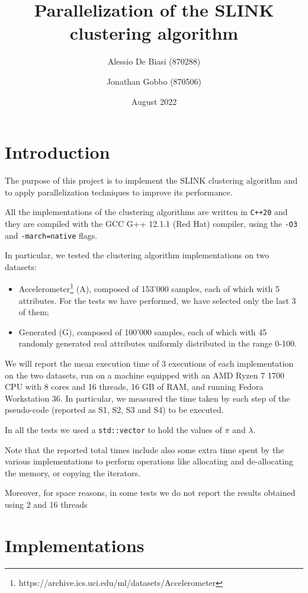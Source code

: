 \documentclass{article}
\title{Parallelization of the SLINK clustering algorithm\vspace{-1.25ex}}
\author{Alessio De Biasi (870288) \and Jonathan Gobbo (870506)}
\date{August 2022}
\begin{document}
\twocolumn
\maketitle

\section{Introduction}

The purpose of this project is to implement the SLINK clustering algorithm and to apply
parallelization techniques to improve its performance.

All the implementations of the clustering algorithms are written in \texttt{C++20} and they are
compiled with the GCC G++ 12.1.1 (Red Hat) compiler, using the \texttt{-O3} and
\texttt{-march=native} flags.

In particular, we tested the clustering algorithm implementations on two datasets:
\begin{itemize}
\item Accelerometer\footnote{https://archive.ics.uci.edu/ml/datasets/Accelerometer} (A), composed
of 153'000 samples, each of which with 5 attributes. For the tests we have performed, we have
selected only the last 3 of them;
\item Generated (G), composed of 100'000 samples, each of which with 45 randomly generated real
attributes uniformly distributed in the range 0-100.
\end{itemize}

We will report the mean execution time of 3 executions of each implementation on the two datasets,
run on a machine equipped with an AMD Ryzen 7 1700 CPU with 8 cores and 16 threads, 16 GB of RAM,
and running Fedora Workstation 36.
In particular, we measured the time taken by each step of the pseudo-code (reported as S1, S2, S3
and S4) to be executed.

In all the tests we used a \texttt{std::vector} to hold the values of $\pi$ and $\lambda$.

Note that the reported total times include also some extra time spent by the various
implementations to perform operations like allocating and de-allocating the memory, or copying
the iterators.

Moreover, for space reasons, in some tests we do not report the results obtained using 2 and 16
threads

\hypertarget{implementations}{
\section{Implementations}
\label{implementations}}
\end{document}
